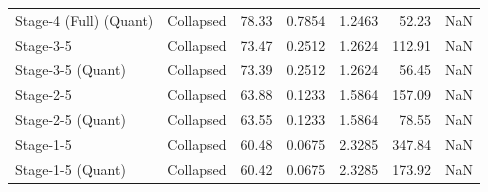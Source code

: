 \begin{table}
\begin{tabular}{llrrrrl}
Stage-4 (Full)
(Quant) & Collapsed & 78.33 & 0.7854 & 1.2463 & 52.23 & NaN \\
Stage-3-5 & Collapsed & 73.47 & 0.2512 & 1.2624 & 112.91 & NaN \\
Stage-3-5
(Quant) & Collapsed & 73.39 & 0.2512 & 1.2624 & 56.45 & NaN \\
Stage-2-5 & Collapsed & 63.88 & 0.1233 & 1.5864 & 157.09 & NaN \\
Stage-2-5
(Quant) & Collapsed & 63.55 & 0.1233 & 1.5864 & 78.55 & NaN \\
Stage-1-5 & Collapsed & 60.48 & 0.0675 & 2.3285 & 347.84 & NaN \\
Stage-1-5
(Quant) & Collapsed & 60.42 & 0.0675 & 2.3285 & 173.92 & NaN \\
\bottomrule
\end{tabular}
\end{table}
